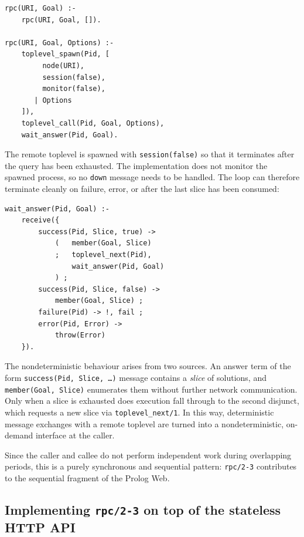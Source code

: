 \begin{verbatim}
rpc(URI, Goal) :-
    rpc(URI, Goal, []).
    
rpc(URI, Goal, Options) :-
    toplevel_spawn(Pid, [
         node(URI),
         session(false),
         monitor(false),
       | Options
    ]),
    toplevel_call(Pid, Goal, Options),
    wait_answer(Pid, Goal).
\end{verbatim}

\noindent The remote toplevel is spawned with \texttt{session(false)} so that it
terminates after the query has been exhausted. The implementation does not monitor
the spawned process, so no \texttt{down} message needs to be handled. The loop
can therefore terminate cleanly on failure, error, or after the last slice has
been consumed:

\begin{verbatim}
wait_answer(Pid, Goal) :-
    receive({
        success(Pid, Slice, true) ->
            (   member(Goal, Slice)
            ;   toplevel_next(Pid),
                wait_answer(Pid, Goal)
            ) ;
        success(Pid, Slice, false) ->
            member(Goal, Slice) ;
        failure(Pid) -> !, fail ;
        error(Pid, Error) ->
            throw(Error)
    }).
\end{verbatim}

\noindent The nondeterministic behaviour arises from two sources. An answer term of the form \texttt{success(Pid,\,Slice,\,\ldots)} message contains a \emph{slice} of
solutions, and \texttt{member(Goal,\,Slice)} enumerates them without further
network communication. Only when a slice is exhausted does execution fall through
to the second disjunct, which requests a new slice via \texttt{toplevel\_next/1}.
In this way, deterministic message exchanges with a remote toplevel are turned
into a nondeterministic, on-demand interface at the caller.

Since the caller and callee do not perform independent work during overlapping
periods, this is a purely synchronous and sequential pattern: \texttt{rpc/2-3}
contributes to the sequential fragment of the Prolog Web.





\subsection{Implementing \texttt{rpc/2-3} on top of the stateless HTTP API}
\label{sec:rpc-on-http}

